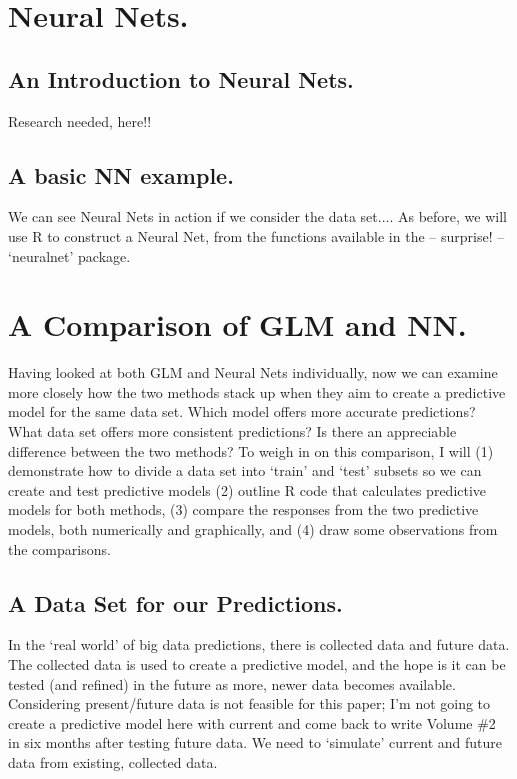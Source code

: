 \documentclass[12pt]{article}
\begin{document}
\section{Neural Nets.}

\subsection{An Introduction to Neural Nets.}
Research needed, here!!

\subsection{A basic NN example.}
We can see Neural Nets in action if we consider the data set....  As before, we will use R to construct a Neural Net, from the functions available
in the -- surprise! -- `neuralnet' package.

\section{A Comparison of GLM and NN.}
Having looked at both GLM and Neural Nets individually, now we can examine more closely how the two methods stack up when they aim to create a 
predictive model for the same data set.  Which model offers more accurate predictions?  What data set offers more consistent predictions?  Is there
an appreciable difference between the two methods?  To weigh in on this comparison, I will (1) demonstrate how to divide a data set into `train' 
and `test' subsets so we can create and test predictive models (2) outline R code that calculates predictive models for both methods, (3) compare 
the responses from the two predictive models, both numerically and graphically, and (4) draw some observations from the comparisons.

\subsection{A Data Set for our Predictions.}
In the `real world' of big data predictions, there is collected data and future data.  The collected data is used to create a predictive model, and
the hope is it can be tested (and refined) in the future as more, newer data becomes available.  Considering present/future data is not feasible 
for this paper; I'm not going to create a predictive model here with current and come back to write Volume \#2 in six months after testing future 
data.  We need to `simulate' current and future data from existing, collected data.
\end{document}
